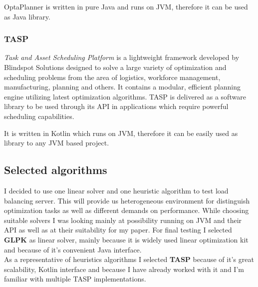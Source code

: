 OptaPlanner is written in pure Java and runs on JVM, therefore it can be used as Java library.

\subsubsection{TASP}
\textit{Task and Asset Scheduling Platform} is a lightweight framework developed by Blindspot Solutions designed to solve a large
variety of optimization and scheduling problems from the area of logistics, workforce management, manufacturing, planning and others.
It contains a modular, efficient planning engine utilizing latest optimization algorithms.
TASP is delivered as a software library to be used through its API in applications which require powerful scheduling capabilities.

It is written in Kotlin which runs on JVM, therefore it can be easily used as library to any JVM based project\@.

\subsection{Selected algorithms}\label{subsec:selected-algorithms}
I decided to use one linear solver and one heuristic algorithm to test load balancing server.
This will provide us heterogeneous environment for distinguish optimization tasks as well as different demands on performance.
While choosing suitable solvers I was looking mainly at possibility running on JVM and their API as well as at their suitability for my paper.
For final testing I selected \textbf{GLPK} as linear solver, mainly because it is widely used linear optimization kit
and because of it's convenient Java interface.\\
As a representative of heuristics algorithms I selected \textbf{TASP} because of it's great scalability, Kotlin interface
and because I have already worked with it and I'm familiar with multiple TASP implementations.
